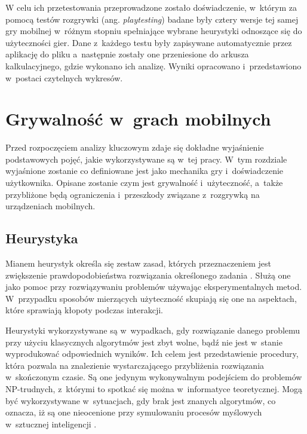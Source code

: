 \documentclass[a4paper,12pt,numbers=noenddot]{report}
\begin{document}
W celu ich przetestowania przeprowadzone zostało doświadczenie, w~którym za pomocą testów rozgrywki (ang. \textit{playtesting}) badane były cztery wersje tej samej gry mobilnej w~różnym stopniu spełniające wybrane heurystyki odnoszące się do użyteczności gier. Dane z~każdego testu były zapisywane automatycznie przez aplikację do pliku a~następnie zostały one przeniesione do arkusza kalkulacyjnego, gdzie wykonano ich analizę. Wyniki opracowano i~przedstawiono w~postaci czytelnych wykresów.


\chapter{Grywalność w~grach mobilnych}
Przed rozpoczęciem analizy kluczowym zdaje się dokładne wyjaśnienie podstawowych pojęć, jakie wykorzystywane są w~tej pracy. W~tym rozdziale wyjaśnione zostanie co definiowane jest jako mechanika gry i~doświadczenie użytkownika. Opisane zostanie czym jest grywalność i~użyteczność, a~także przybliżone będą ograniczenia i~przeszkody związane z~rozgrywką na urządzeniach mobilnych.

\section{Heurystyka}
Mianem heurystyk określa się zestaw zasad, których przeznaczeniem jest zwiększenie prawdopodobieństwa rozwiązania określonego zadania \cite{art_WithHeuristic}. Służą one jako pomoc przy rozwiązywaniu problemów używając eksperymentalnych metod. W~przypadku sposobów mierzących użyteczność skupiają się one na aspektach, które sprawiają kłopoty podczas interakcji\cite{art_Nielsen}\cite{art_evaluatingPlayabilityMG}. 

Heurystyki wykorzystywane są w~wypadkach, gdy rozwiązanie danego problemu przy użyciu klasycznych algorytmów jest zbyt wolne, bądź nie jest w~stanie wyprodukować odpowiednich wyników. Ich celem jest przedstawienie procedury, która pozwala na znalezienie wystarczającego przybliżenia rozwiązania w~skończonym czasie. Są one jedynym wykonywalnym podejściem do problemów NP-trudnych, z~którymi to spotkać się można w~informatyce teoretycznej. Mogą być wykorzystywane w~sytuacjach, gdy brak jest znanych algorytmów, co oznacza, iż są one nieocenione przy symulowaniu procesów myślowych w~sztucznej inteligencji \cite{art_HeuristicsDef}.
\end{document}
